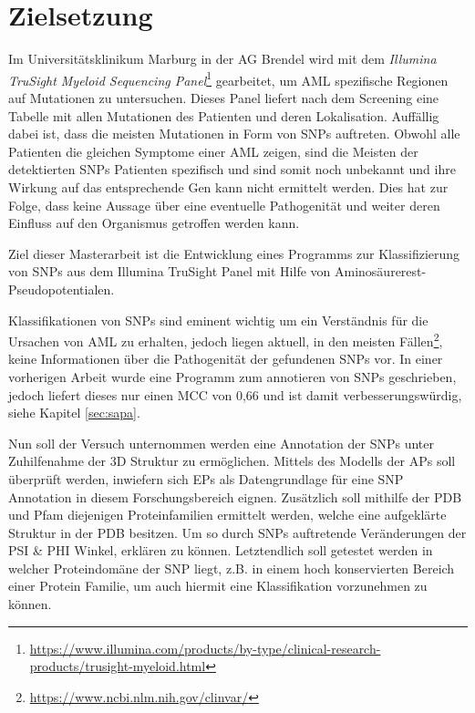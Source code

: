 \section{Zielsetzung}

Im Universitätsklinikum Marburg in der AG Brendel wird mit dem \emph{Illumina TruSight Myeloid Sequencing Panel}\footnote{\url{https://www.illumina.com/products/by-type/clinical-research-products/trusight-myeloid.html}} gearbeitet, um \ac{AML} spezifische Regionen auf Mutationen zu untersuchen. Dieses Panel liefert nach dem Screening eine Tabelle mit allen Mutationen des Patienten und deren Lokalisation. Auffällig dabei ist, dass die meisten Mutationen in Form von \ac{SNPs} auftreten. Obwohl alle Patienten die gleichen Symptome einer \ac{AML} zeigen, sind die Meisten der detektierten \ac{SNPs} Patienten spezifisch und sind somit noch unbekannt und ihre Wirkung auf das entsprechende Gen kann nicht ermittelt werden. Dies hat zur Folge, dass keine Aussage über eine eventuelle Pathogenität und weiter deren Einfluss auf den Organismus getroffen werden kann. 

Ziel dieser Masterarbeit ist die Entwicklung eines Programms zur Klassifizierung von \ac{SNPs} aus dem Illumina TruSight Panel mit Hilfe von Aminosäurerest-Pseudopotentialen.

Klassifikationen von \ac{SNPs} sind eminent wichtig um ein Verständnis für die Ursachen von \ac{AML} zu erhalten, jedoch liegen aktuell, in den meisten Fällen\footnote{\url{https://www.ncbi.nlm.nih.gov/clinvar/}}, keine Informationen über die Pathogenität der gefundenen \ac{SNPs} vor. In einer vorherigen Arbeit wurde eine Programm zum annotieren von \ac{SNPs} geschrieben, jedoch liefert dieses nur einen \ac{MCC} von 0,66 und ist damit verbesserungswürdig, siehe Kapitel \ref{sec:sapa}. 

Nun soll der Versuch unternommen werden eine Annotation der \ac{SNPs} unter Zuhilfenahme der 3D Struktur zu ermöglichen. Mittels des Modells der \ac{APs} soll überprüft werden, inwiefern sich \ac{EPs} als Datengrundlage für eine \ac{SNP} Annotation in diesem Forschungsbereich eignen. Zusätzlich soll mithilfe der PDB und Pfam diejenigen Proteinfamilien ermittelt werden, welche eine aufgeklärte Struktur in der PDB besitzen. Um so durch \ac{SNPs} auftretende Veränderungen der PSI \& PHI Winkel, erklären zu können. Letztendlich soll getestet werden in welcher Proteindomäne der \ac{SNP} liegt, z.B. in einem hoch konservierten Bereich einer Protein Familie, um auch hiermit eine Klassifikation vorzunehmen zu können.



